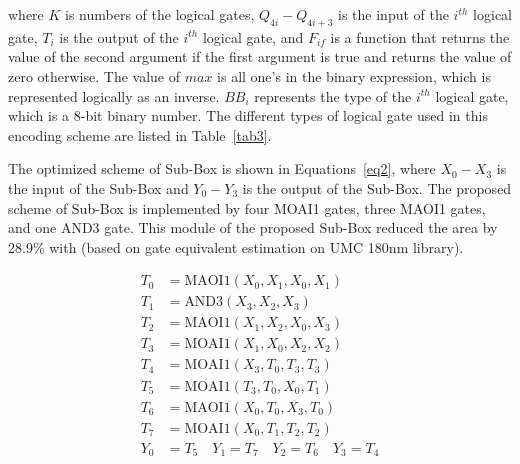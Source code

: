 \documentclass[final,5p,times,twocolumn]{elsarticle}
\begin{document}
where $K$ is numbers of the logical gates, $Q_{4i}-Q_{4i+3}$ is the input of the $i^{th}$ logical gate, $T_i$ is the output of the $i^{th}$ logical gate, and $F_{if}$ is a function that returns the value of the second argument if the first argument is true and returns the value of zero otherwise.
The value of $max$ is all one's in the binary expression, which is represented logically as an inverse.
$BB_i$ represents the type of the $i^{th}$ logical gate, which is a 8-bit binary number. The different types of logical gate used in this encoding scheme are listed in Table~\ref{tab3}.


The optimized scheme of Sub-Box is shown in Equations~\ref{eq2}, where $X_0-X_3$ is the input of the Sub-Box and $Y_0-Y_3$ is the output of the Sub-Box.
The proposed scheme of Sub-Box is implemented by four MOAI1 gates, three MAOI1 gates, and one AND3 gate.
This module of the proposed Sub-Box reduced the area by 28.9\% with \cite{bao2019peigen} (based on gate equivalent estimation on UMC 180nm library).

\begin{align}
    T_0 & = \text{MAOI1}(X_0, X_1, X_0, X_1) \nonumber          \\
    T_1 & = \text{AND3}(X_3, X_2, X_3) \nonumber                \\
    T_2 & = \text{MAOI1}(X_1, X_2, X_0, X_3) \nonumber          \\
    T_3 & = \text{MOAI1}(X_1, X_0, X_2, X_2) \nonumber          \\
    T_4 & = \text{MOAI1}(X_3, T_0, T_3, T_3) \label{eq2}        \\
    T_5 & = \text{MOAI1}(T_3, T_0, X_0, T_1) \nonumber          \\
    T_6 & = \text{MAOI1}(X_0, T_0, X_3, T_0) \nonumber          \\
    T_7 & = \text{MOAI1}(X_0, T_1, T_2, T_2) \nonumber          \\
    Y_0 & = T_5 \quad Y_1 = T_7 \quad Y_2 = T_6 \quad Y_3 = T_4
    \nonumber
\end{align}
\end{document}
